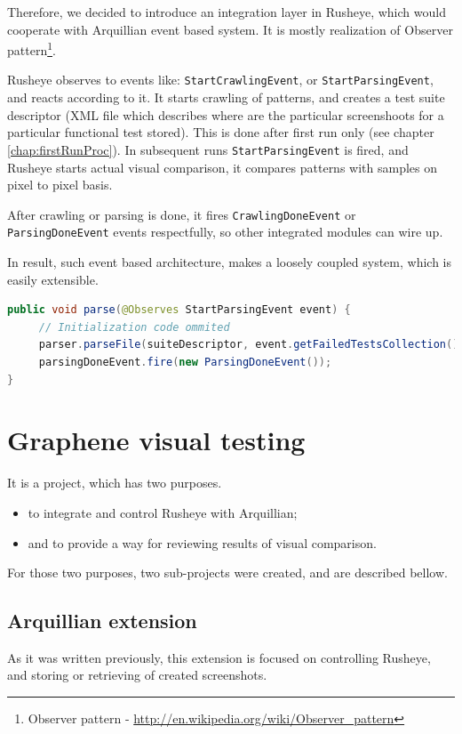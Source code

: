 \documentclass[11pt,oneside,final]{fithesis2}
\begin{document}
Therefore, we decided to introduce an integration layer in Rusheye, which would cooperate with Arquillian event based system.
It is mostly realization of Observer pattern\footnote{Observer pattern - \url{http://en.wikipedia.org/wiki/Observer_pattern}}.

Rusheye observes to events like: \texttt{StartCrawlingEvent}, or \texttt{StartParsingEvent}, and reacts according to it. It starts
crawling of patterns, and creates a test suite descriptor (XML file which describes where are the particular screenshoots for a particular
functional test stored). This is done after first run only (see chapter \ref{chap:firstRunProc}). In subsequent runs \texttt{StartParsingEvent}
is fired, and Rusheye starts actual visual comparison, it compares patterns with samples on pixel to pixel basis.

After crawling or parsing is done, it fires \texttt{CrawlingDoneEvent} or \texttt{ParsingDoneEvent} events respectfully, so other integrated
modules can wire up.

In result, such event based architecture, makes a loosely coupled system, which is easily extensible.

\begin{lstlisting}[caption=Example of StartParsingEvent observer,label=lis:startParsingObserver,language=java]
public void parse(@Observes StartParsingEvent event) {
     // Initialization code ommited
     parser.parseFile(suiteDescriptor, event.getFailedTestsCollection());
     parsingDoneEvent.fire(new ParsingDoneEvent());
}
\end{lstlisting}
  
\section{Graphene visual testing}
    It is a project, which has two purposes.
    \begin{itemize}
     \item to integrate and control Rusheye with Arquillian;
     \item and to provide a way for reviewing results of visual comparison.
    \end{itemize}

    For those two purposes, two sub-projects were created, and are described bellow.
    
    \subsection{Arquillian extension}
    As it was written previously, this extension is focused on controlling Rusheye, and storing or retrieving of created screenshots.
    
\end{document}
